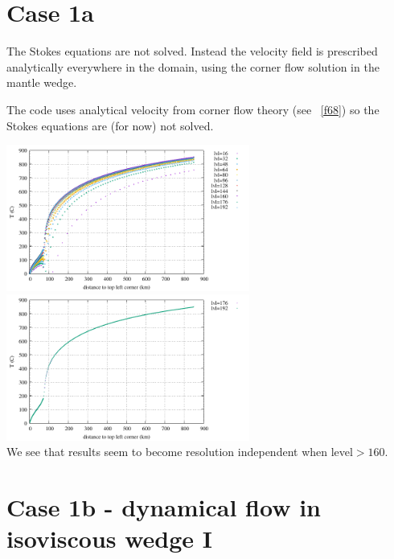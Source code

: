 \section*{Case 1a}

The Stokes equations are not solved. Instead the velocity field
is prescribed analytically everywhere in the domain, using the corner flow solution 
in the mantle wedge. 

The code uses analytical velocity from corner flow theory (see \stone~\ref{f68})
so the Stokes equations are (for now) not solved. 


\begin{center}
\includegraphics[width=8cm]{python_codes/fieldstone_149/results/case1a/diagT.pdf}
\includegraphics[width=8cm]{python_codes/fieldstone_149/results/case1a/diagT2.pdf}\\
{\captionfont We see that results seem to become resolution independent
when level$>160$.} 
\end{center}

\section*{Case 1b - dynamical flow in isoviscous wedge I}

